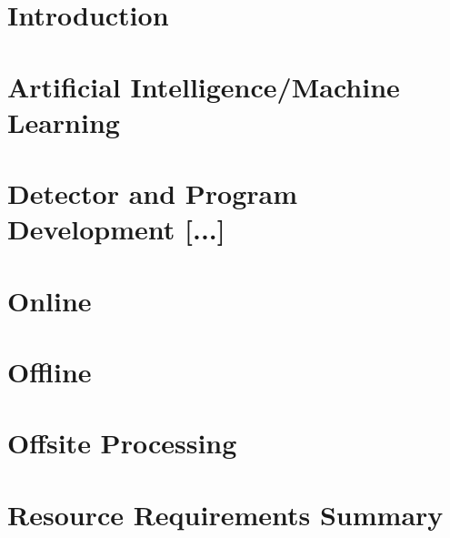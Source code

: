 \documentclass[12pt,twoside]{article}
\begin{document}
\linenumbers
\pagestyle{empty}




\setcounter{page}{1}



\tableofcontents


\renewcommand{\thepage}{\arabic{page}}

\section {Introduction}
\label{sec:introduction}


\section {Artificial Intelligence/Machine Learning}
\label{sec:ai}


\section {Detector and Program Development [...]}
\label{sec:detector_development}


\section {Online}
\label{sec:online}



\section {Offline}
\label{sec:offline}


\section {Offsite Processing}
\label{sec:offsite}


\section {Resource Requirements Summary}
\label{sec:resources}





%

%

\listoftodos[To Do]



\end{document}

